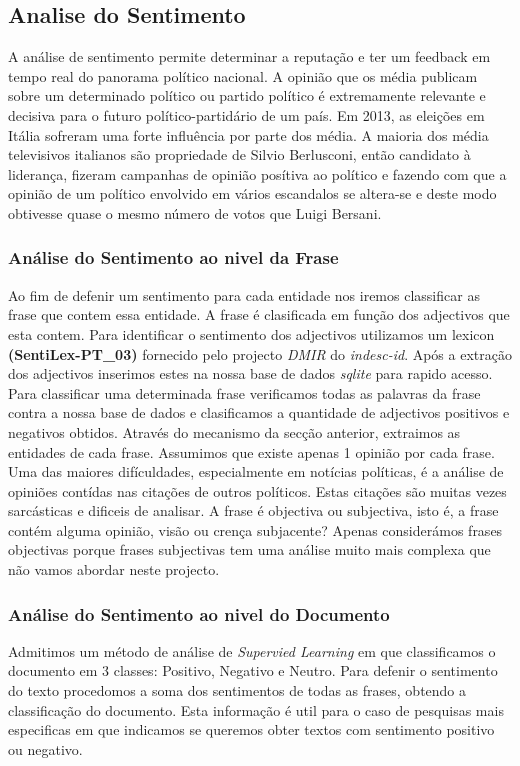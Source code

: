 \subsection{Analise do Sentimento}
\label{sec:sentiment_analysis}
\hspace{15pt}A análise de sentimento permite determinar a reputação e ter um feedback em tempo real do panorama político nacional. A opinião que os média publicam sobre um determinado político ou partido político é extremamente relevante e decisiva para o futuro político-partidário de um país. Em 2013, as eleições em Itália sofreram uma forte influência por parte dos média. A maioria dos média televisivos italianos são propriedade de Silvio Berlusconi, então candidato à liderança, fizeram campanhas de opinião posítiva ao político e fazendo com que a opinião de um político envolvido em vários escandalos se altera-se e deste modo obtivesse quase o mesmo número de votos que Luigi Bersani.\newline\hspace{15pt}

\subsubsection{Análise do Sentimento ao nivel da Frase}
\hspace{15pt}Ao fim de defenir um sentimento para cada entidade nos iremos classificar as frase que contem essa entidade. A frase é clasificada em função dos adjectivos que esta contem. Para identificar o sentimento dos adjectivos utilizamos um lexicon \textbf{(SentiLex-PT\_03)} fornecido pelo projecto \textit{DMIR} do \textit{indesc-id}. Após a extração dos adjectivos inserimos estes na nossa base de dados \textit{sqlite} para rapido acesso. Para classificar uma determinada frase verificamos todas as palavras da frase contra a nossa base de dados e clasificamos a quantidade de adjectivos positivos e negativos obtidos. Através do mecanismo da secção anterior, extraimos as entidades de cada frase. Assumimos que existe apenas 1 opinião por cada frase.\\
Uma das maiores difículdades, especialmente em notícias políticas, é a análise de opiniões contídas nas citações de outros políticos. Estas citações são muitas vezes sarcásticas e dificeis de analisar. A frase é objectiva ou subjectiva, isto é, a frase contém alguma opinião, visão ou crença subjacente? Apenas considerámos frases objectivas porque frases subjectivas tem uma análise muito mais complexa que não vamos abordar neste projecto. 

\subsubsection{Análise do Sentimento ao nivel do Documento}
\hspace{15pt}Admitimos um método de análise de \textit{Supervied Learning} em que classificamos o documento em 3 classes: Positivo, Negativo e Neutro. Para defenir o sentimento do texto procedomos a soma dos sentimentos de todas as frases, obtendo a classificação do documento. Esta informação é util para o caso de pesquisas mais especificas em que indicamos se queremos obter textos com sentimento positivo ou negativo.

